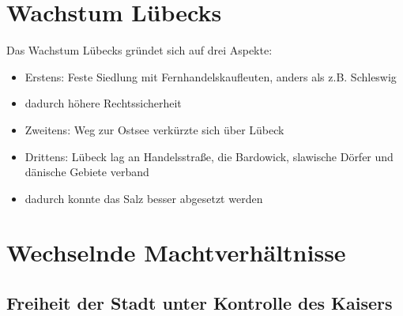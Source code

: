 \documentclass[10pt,a4paper,oneside,ngerman,numbers=noenddot]{scrartcl}
\newenvironment{myitemize}{\begin{itemize}\itemsep -2pt}{\end{itemize}} %
\begin{document}
\section*{Wachstum Lübecks}

Das Wachstum Lübecks gründet sich auf drei Aspekte:

\begin{myitemize}
    \item Erstens: Feste Siedlung mit Fernhandelskaufleuten, anders als z.B. Schleswig
    \item dadurch höhere Rechtssicherheit
    \item Zweitens: Weg zur Ostsee verkürzte sich über Lübeck
    \item Drittens: Lübeck lag an Handelsstraße, die Bardowick, slawische Dörfer und dänische Gebiete verband
    \item dadurch konnte das Salz besser abgesetzt werden
\end{myitemize}

\section*{Wechselnde Machtverhältnisse}

\subsection*{Freiheit der Stadt unter Kontrolle des Kaisers}
\end{document}
